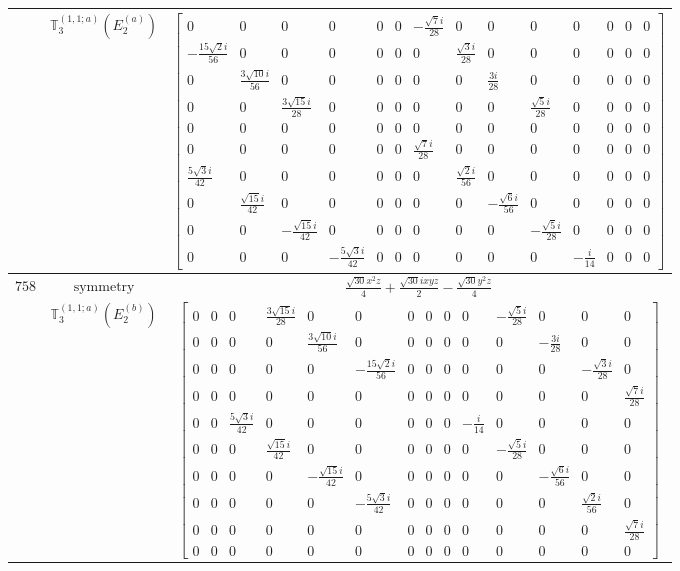 \documentclass[fleqn,8pt,landscape]{jsarticle}
\begin{document}
\begin{longtable}{ccc}
$  $ & $ \mathbb{T}_{3}^{(1,1;a)}(E_{2}^{(a)}) $ & $ \begin{bmatrix} 0 & 0 & 0 & 0 & 0 & 0 & - \frac{\sqrt{7} i}{28} & 0 & 0 & 0 & 0 & 0 & 0 & 0 \\ - \frac{15 \sqrt{2} i}{56} & 0 & 0 & 0 & 0 & 0 & 0 & \frac{\sqrt{3} i}{28} & 0 & 0 & 0 & 0 & 0 & 0 \\ 0 & \frac{3 \sqrt{10} i}{56} & 0 & 0 & 0 & 0 & 0 & 0 & \frac{3 i}{28} & 0 & 0 & 0 & 0 & 0 \\ 0 & 0 & \frac{3 \sqrt{15} i}{28} & 0 & 0 & 0 & 0 & 0 & 0 & \frac{\sqrt{5} i}{28} & 0 & 0 & 0 & 0 \\ 0 & 0 & 0 & 0 & 0 & 0 & 0 & 0 & 0 & 0 & 0 & 0 & 0 & 0 \\ 0 & 0 & 0 & 0 & 0 & 0 & \frac{\sqrt{7} i}{28} & 0 & 0 & 0 & 0 & 0 & 0 & 0 \\ \frac{5 \sqrt{3} i}{42} & 0 & 0 & 0 & 0 & 0 & 0 & \frac{\sqrt{2} i}{56} & 0 & 0 & 0 & 0 & 0 & 0 \\ 0 & \frac{\sqrt{15} i}{42} & 0 & 0 & 0 & 0 & 0 & 0 & - \frac{\sqrt{6} i}{56} & 0 & 0 & 0 & 0 & 0 \\ 0 & 0 & - \frac{\sqrt{15} i}{42} & 0 & 0 & 0 & 0 & 0 & 0 & - \frac{\sqrt{5} i}{28} & 0 & 0 & 0 & 0 \\ 0 & 0 & 0 & - \frac{5 \sqrt{3} i}{42} & 0 & 0 & 0 & 0 & 0 & 0 & - \frac{i}{14} & 0 & 0 & 0 \end{bmatrix} $ \\ \hline
$ 758 $ & $ \text{symmetry} $ & $ \frac{\sqrt{30} x^{2} z}{4} + \frac{\sqrt{30} i x y z}{2} - \frac{\sqrt{30} y^{2} z}{4} $ \\
$  $ & $ \mathbb{T}_{3}^{(1,1;a)}(E_{2}^{(b)}) $ & $ \begin{bmatrix} 0 & 0 & 0 & \frac{3 \sqrt{15} i}{28} & 0 & 0 & 0 & 0 & 0 & 0 & - \frac{\sqrt{5} i}{28} & 0 & 0 & 0 \\ 0 & 0 & 0 & 0 & \frac{3 \sqrt{10} i}{56} & 0 & 0 & 0 & 0 & 0 & 0 & - \frac{3 i}{28} & 0 & 0 \\ 0 & 0 & 0 & 0 & 0 & - \frac{15 \sqrt{2} i}{56} & 0 & 0 & 0 & 0 & 0 & 0 & - \frac{\sqrt{3} i}{28} & 0 \\ 0 & 0 & 0 & 0 & 0 & 0 & 0 & 0 & 0 & 0 & 0 & 0 & 0 & \frac{\sqrt{7} i}{28} \\ 0 & 0 & \frac{5 \sqrt{3} i}{42} & 0 & 0 & 0 & 0 & 0 & 0 & - \frac{i}{14} & 0 & 0 & 0 & 0 \\ 0 & 0 & 0 & \frac{\sqrt{15} i}{42} & 0 & 0 & 0 & 0 & 0 & 0 & - \frac{\sqrt{5} i}{28} & 0 & 0 & 0 \\ 0 & 0 & 0 & 0 & - \frac{\sqrt{15} i}{42} & 0 & 0 & 0 & 0 & 0 & 0 & - \frac{\sqrt{6} i}{56} & 0 & 0 \\ 0 & 0 & 0 & 0 & 0 & - \frac{5 \sqrt{3} i}{42} & 0 & 0 & 0 & 0 & 0 & 0 & \frac{\sqrt{2} i}{56} & 0 \\ 0 & 0 & 0 & 0 & 0 & 0 & 0 & 0 & 0 & 0 & 0 & 0 & 0 & \frac{\sqrt{7} i}{28} \\ 0 & 0 & 0 & 0 & 0 & 0 & 0 & 0 & 0 & 0 & 0 & 0 & 0 & 0 \end{bmatrix} $ \\ \hline

\end{longtable}
\end{document}
